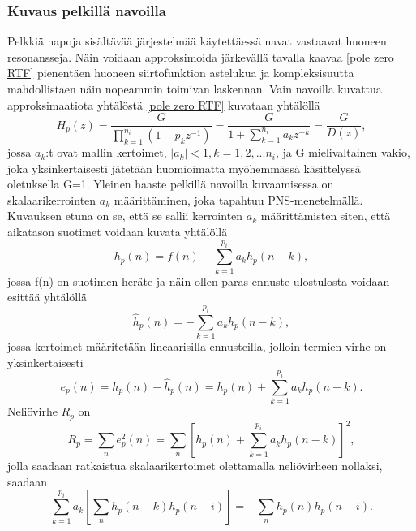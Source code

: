 \documentclass[finnish,12pt]{article}
\begin{document}
\subsubsection{Kuvaus pelkillä navoilla}

Pelkkiä napoja sisältävää järjestelmää käytettäessä navat vastaavat huoneen resonansseja. Näin voidaan approksimoida järkevällä tavalla kaavaa \eqref{pole zero RTF} pienentäen huoneen siirtofunktion astelukua ja kompleksisuutta mahdollistaen näin nopeammin toimivan laskennan. Vain navoilla kuvattua approksimaatiota yhtälöstä \eqref{pole zero RTF} kuvataan yhtälöllä \begin{equation}
H_p(z) = \frac{G}{\prod\limits_{k=1}^{n_i} \left( 1-p_k z^{-1} \right)} = \frac{G}{1+\sum\limits_{k=1}^{n_i} a_k z^{-k}} = \frac{G}{D(z)},
\label{all-pole RTF}
\end{equation} jossa $a_k$:t ovat mallin kertoimet, $\left| a_k \right| < 1, k=1,2,...n_i$, ja G mielivaltainen vakio, joka yksinkertaisesti jätetään huomioimatta myöhemmässä käsittelyssä oletuksella G=1. Yleinen haaste pelkillä navoilla kuvaamisessa on skalaarikerrointen $a_k$ määrittäminen, joka tapahtuu PNS-menetelmällä. Kuvauksen etuna on se, että se sallii kerrointen $a_k$ määrittämisten siten, että aikatason suotimet voidaan kuvata yhtälöllä \begin{equation}
h_p(n) = f(n) - \sum\limits_{k=1}^{p_i} a_k h_p(n-k),
\end{equation} jossa f(n) on suotimen heräte ja näin ollen paras ennuste ulostulosta voidaan esittää yhtälöllä \begin{equation}
\hat{h}_p(n) = - \sum\limits_{k=1}^{p_i} a_k h_p(n - k),
\end{equation} jossa kertoimet määritetään lineaarisilla ennusteilla, jolloin termien virhe on yksinkertaisesti \begin{equation}
e_p(n) = h_p(n) - \hat{h}_p(n) = h_p(n) + \sum\limits_{k=1}^{p_i} a_k h_p(n - k).
\end{equation} Neliövirhe $R_p$ on \begin{equation}
\label{all-pole squared error}
R_p = \sum_n e_p^2(n) = \sum_n \left[ h_p(n) + \sum\limits_{k=1}^{p_i} a_k h_p(n - k) \right]^2, 
\end{equation} jolla saadaan ratkaistua skalaarikertoimet olettamalla neliövirheen nollaksi, saadaan \begin{equation}
\sum\limits_{k=1}^{p_i} a_k \left[ \sum_n h_p(n-k) h_p(n-i) \right] = - \sum_n h_p(n) h_p(n-i).
\end{equation}
\end{document}
